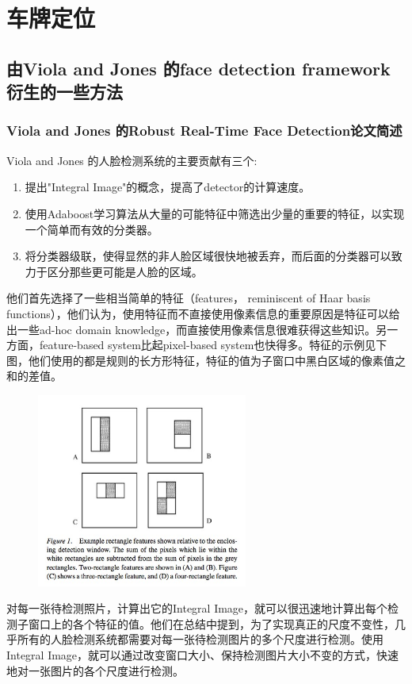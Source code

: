 \section{车牌定位}
\subsection{由Viola and Jones 的face detection framework 衍生的一些方法}
\subsubsection{Viola and Jones 的Robust Real-Time Face Detection论文简述}
Viola and Jones 的人脸检测系统的主要贡献有三个:
\begin{enumerate}
\item
提出"Integral Image"的概念，提高了detector的计算速度。
\item
使用Adaboost学习算法从大量的可能特征中筛选出少量的重要的特征，以实现一个简单而有效的分类器。
\item
将分类器级联，使得显然的非人脸区域很快地被丢弃，而后面的分类器可以致力于区分那些更可能是人脸的区域。
\end{enumerate}
他们首先选择了一些相当简单的特征（features， reminiscent of Haar basis functions），他们认为，使用特征而不直接使用像素信息的重要原因是特征可以给出一些ad-hoc domain knowledge，而直接使用像素信息很难获得这些知识。另一方面，feature-based system比起pixel-based system也快得多。特征的示例见下图，他们使用的都是规则的长方形特征，特征的值为子窗口中黑白区域的像素值之和的差值。
\begin{figure}[H]
    \centering 
    \includegraphics[width=0.618\textwidth]{image/2_1_1_1.jpg}    
    \label{logic}
\end{figure}
对每一张待检测照片，计算出它的Integral Image，就可以很迅速地计算出每个检测子窗口上的各个特征的值。他们在总结中提到，为了实现真正的尺度不变性，几乎所有的人脸检测系统都需要对每一张待检测图片的多个尺度进行检测。使用Integral Image，就可以通过改变窗口大小、保持检测图片大小不变的方式，快速地对一张图片的各个尺度进行检测。

